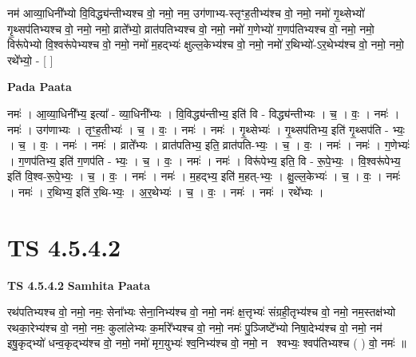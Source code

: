 \documentclass[17pt]{extarticle}
\begin{document}
नम॑ आव्या॒धिनी᳚भ्यो वि॒विद्ध्य॑न्तीभ्यश्च वो॒ नमो॒                             नम॒ उग॑णाभ्य-स्तृꣳह॒तीभ्य॑श्च वो॒ नमो॒                                          नमो॑ गृ॒थ्सेभ्यो॑ गृ॒थ्सप॑तिभ्यश्च वो॒ नमो॒                                                नमो॒ व्राते᳚भ्यो॒ व्रात॑पतिभ्यश्च वो॒ नमो॒                                             नमो॑ ग॒णेभ्यो॑ ग॒णप॑तिभ्यश्च वो॒ नमो॒                                                      नमो॒ विरू॑पेभ्यो वि॒श्वरू॑पेभ्यश्च वो॒ नमो॒                                            नमो॑ म॒हद्भ्यः॑ क्षुल्ल॒केभ्य॑श्च वो॒ नमो॒                                           नमो॑ र॒थिभ्यो॑-ऽर॒थेभ्य॑श्च वो॒ नमो॒                                                       नमो॒ रथे᳚भ्यो॒ - [  ] \newline

\textbf{Pada Paata} \newline

नमः॑ । आ॒व्या॒धिनी᳚भ्य॒ इत्या᳚ - व्या॒धिनी᳚भ्यः । वि॒विद्ध्य॑न्तीभ्य॒ इति॑ वि - विद्ध्य॑न्तीभ्यः । च॒ । वः॒ । नमः॑ । नमः॑ । उग॑णाभ्यः । तृꣳ॒॒ह॒तीभ्यः॑ । च॒ । वः॒ । नमः॑ । नमः॑ । गृ॒थ्सेभ्यः॑ । गृ॒थ्सप॑तिभ्य॒ इति॑ गृ॒थ्सप॑ति - भ्यः॒ । च॒ । वः॒ । नमः॑ । नमः॑ । व्राते᳚भ्यः । व्रात॑पतिभ्य॒ इति॒ व्रात॑पति-भ्यः॒ । च॒ । वः॒ । नमः॑ । नमः॑ । ग॒णेभ्यः॑ । ग॒णप॑तिभ्य॒ इति॑ ग॒णप॑ति - भ्यः॒ । च॒ । वः॒ । नमः॑ । नमः॑ । विरू॑पेभ्य॒ इति॒ वि - रू॒पे॒भ्यः॒ । वि॒श्वरू॑पेभ्य॒ इति॑ वि॒श्व-रू॒पे॒भ्यः॒ । च॒ । वः॒ । नमः॑ । नमः॑ । म॒हद्भ्य॒ इति॑ म॒हत्-भ्यः॒ । क्षु॒ल्ल॒केभ्यः॑ । च॒ । वः॒ । नमः॑ । नमः॑ । र॒थिभ्य॒ इति॑ र॒थि-भ्यः॒ । अ॒र॒थेभ्यः॑ । च॒ । वः॒ । नमः॑ । नमः॑ । रथे᳚भ्यः ।  \newline




\section*{ TS 4.5.4.2 }

\textbf{TS 4.5.4.2 } \newline
\textbf{Samhita Paata} \newline

रथ॑पतिभ्यश्च वो॒ नमो॒                                                      नमः॒ सेना᳚भ्यः सेना॒निभ्य॑श्च वो॒ नमो॒                                               नमः॑ क्ष॒त्तृभ्यः॑ संग्रही॒तृभ्य॑श्च वो॒ नमो॒                                     नम॒स्तक्ष॑भ्यो रथका॒रेभ्य॑श्च वो॒ नमो॒                                                    नमः॒ कुला॑लेभ्यः क॒र्मारे᳚भ्यश्च वो॒ नमो॒                                            नमः॑ पु॒ञ्जिष्टे᳚भ्यो निषा॒देभ्य॑श्च वो॒ नमो॒                                                नम॑ इषु॒कृद्भ्यो॑ धन्व॒कृद्भ्य॑श्च वो॒ नमो॒                                                नमो॑ मृग॒युभ्यः॑ श्व॒निभ्य॑श्च वो॒ नमो॒                                                     नमः᳡श्वभ्यः॒ श्वप॑तिभ्यश्च ( ) वो॒ नमः॑ ॥ \newline
\end{document}
